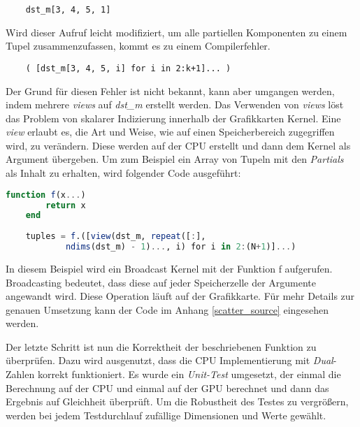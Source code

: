 \begin{verbatim}
    dst_m[3, 4, 5, 1]
\end{verbatim}
Wird dieser Aufruf leicht modifiziert, um alle partiellen Komponenten zu einem Tupel zusammenzufassen, 
kommt es zu einem Compilerfehler.
\begin{verbatim}
    ( [dst_m[3, 4, 5, i] for i in 2:k+1]... )
\end{verbatim}
Der Grund für diesen Fehler ist nicht bekannt, kann aber umgangen werden, indem mehrere \textit{views} auf
\textit{dst\_m} erstellt werden.
Das Verwenden von \textit{views} löst das Problem von skalarer Indizierung innerhalb der Grafikkarten Kernel. 
Eine \textit{view} erlaubt es, die Art und Weise, wie auf einen Speicherbereich zugegriffen wird, zu verändern.
Diese werden auf der CPU erstellt und dann dem Kernel als Argument übergeben.
Um zum Beispiel ein Array von Tupeln mit den \textit{Partials} als Inhalt zu erhalten, wird folgender Code ausgeführt:
\begin{lstlisting}[language=Julia]
	function f(x...)
		return x
	end
	
	tuples = f.([view(dst_m, repeat([:], 
	        ndims(dst_m) - 1)..., i) for i in 2:(N+1)]...)
\end{lstlisting}
In diesem Beispiel wird ein Broadcast Kernel mit der Funktion f aufgerufen.
Broadcasting bedeutet, dass diese auf jeder Speicherzelle der Argumente angewandt wird.
Diese Operation läuft auf der Grafikkarte.
Für mehr Details zur genauen Umsetzung kann der Code im Anhang \ref{scatter_source} eingesehen werden.


Der letzte Schritt ist nun die Korrektheit der beschriebenen Funktion zu 
überprüfen. Dazu wird ausgenutzt, dass die CPU Implementierung mit \textit{Dual}-Zahlen korrekt funktioniert.
Es wurde ein \textit{Unit-Test} umgesetzt, der einmal die Berechnung 
auf der CPU und einmal auf der GPU berechnet und dann das Ergebnis
auf Gleichheit überprüft.
Um die Robustheit des Testes zu vergrößern, werden bei jedem Testdurchlauf zufällige Dimensionen und Werte gewählt.
